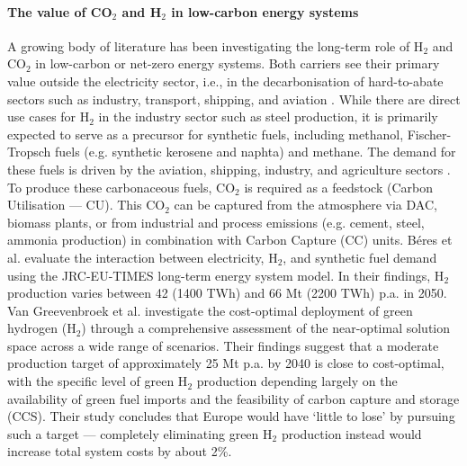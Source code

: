 \documentclass[pdflatex,sn-nature]{sn-jnl}%
\theoremstyle{thmstyleone}%
\theoremstyle{thmstyletwo}%
\theoremstyle{thmstylethree}%
\begin{document}
 
\paragraph{The value of CO$_2$ and H$_2$ in low-carbon energy systems} 
A growing body of literature has been investigating the long-term role of H$_2$ and CO$_2$ in low-carbon or net-zero energy systems. Both carriers see their primary value outside the electricity sector, i.e., in the decarbonisation of hard-to-abate sectors such as industry, transport, shipping, and aviation \cite{reigstadMovingLowcarbonHydrogen2022}. While there are direct use cases for H$_2$ in the industry sector such as steel production, it is primarily expected to serve as a precursor for synthetic fuels, including methanol, Fischer-Tropsch fuels (e.g. synthetic kerosene and naphta) and methane. The demand for these fuels is driven by the aviation, shipping, industry, and agriculture sectors \cite{neumannPotentialRoleHydrogen2023}. To produce these carbonaceous fuels, CO$_2$ is required as a feedstock (Carbon Utilisation --- CU). This CO$_2$ can be captured from the atmosphere via DAC, biomass plants, or from industrial and process emissions (e.g. cement, steel, ammonia production) in combination with Carbon Capture (CC) units.
Béres et al. \cite{beresWillHydrogenSynthetic2024} evaluate the interaction between electricity, H$_2$, and synthetic fuel demand using the JRC-EU-TIMES long-term energy system model. In their findings, H$_2$ production varies between 42 (1400 TWh) and 66 Mt (2200 TWh) p.a. in 2050. 
Van Greevenbroek et al. \cite{greevenbroekLittleLoseCase2024} investigate the cost-optimal deployment of green hydrogen (H$_2$) through a comprehensive assessment of the near-optimal solution space across a wide range of scenarios. Their findings suggest that a moderate production target of approximately 25 Mt p.a. by 2040 is close to cost-optimal, with the specific level of green H$_2$ production depending largely on the availability of green fuel imports and the feasibility of carbon capture and storage (CCS). Their study concludes that Europe would have `little to lose' by pursuing such a target --- completely eliminating green H$_2$ production instead would increase total system costs by about 2\%.
\end{document}
